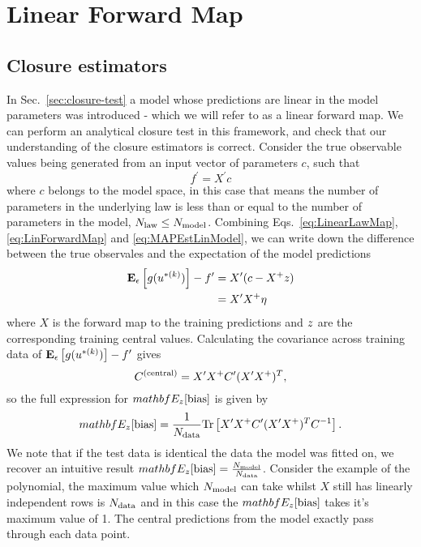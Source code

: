 \section{Linear Forward Map}

\subsection{Closure estimators}

In Sec.~\ref{sec:closure-test} a model whose predictions are linear in the
model parameters was introduced - which we will refer to as a linear forward map.
We can perform an analytical closure test in this framework, and check that our
understanding of the closure estimators is correct. Consider the true observable
values being generated from an input vector of parameters $c$, such that
\begin{equation}\label{eq:LinearLawMap}
    f^\prime = X^\prime c
\end{equation}
where $c$ belongs to the model space, in this case that means the number of parameters
in the underlying law is less than or equal to the number of parameters in the
model, $N_{\rm law} \leq N_{\rm model}$. Combining Eqs.~\ref{eq:LinearLawMap},
\ref{eq:LinForwardMap} and \ref{eq:MAPEstLinModel}, we can write down the
difference between the true observales and the expectation of the model
predictions
\begin{equation}
    \begin{split}
        \mathbf{E}_{\epsilon}\left[ g(u^{* (k)}) \right] - f^\prime &= X^\prime (c - X^+ z ) \\
        &= X^\prime X^+ \eta
    \end{split}
\end{equation}
where $X$ is the forward map to the training predictions and $z$ are
the corresponding training central values. Calculating the covariance across
training data of $\mathbf{E}_{\epsilon}\left[ g(u^{* (k)}) \right] - f^\prime$ gives
\begin{equation}
    C^{(\rm central)} = X^\prime X^+ C^\prime (X^\prime X^+)^T,
\end{equation}
so the full expression for $mathbf{E}_{z}[{\rm bias}]$ is given by
\begin{equation}
    mathbf{E}_{z}[{\rm bias}] = \frac{1}{N_{\rm data}}
    {\rm Tr} \left[ X^\prime X^+ C^\prime (X^\prime X^+)^T C^{-1}_{} \right].
\end{equation}
We note that if the test data is identical the data the model was fitted on,
we recover an intuitive result $mathbf{E}_{z}[{\rm bias}] = \frac{N_{\rm model}}{N_{\rm data}}$.
Consider the example of the polynomial, the maximum value which $N_{\rm model}$ can
take whilst $X$ still has linearly independent rows is $N_{\rm data}$ and in this case
the $mathbf{E}_{z}[{\rm bias}]$ takes it's maximum value of 1. The central
predictions from the model exactly pass through each data point.

